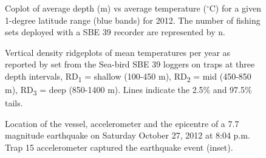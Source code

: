 \documentclass[12pt]{article}\usepackage[]{graphicx}\usepackage[]{color}
\begin{document}
\begin{figure}[htb]

{\centering {} 

}

\caption{Coplot of average depth (m) vs average temperature (\(^\circ\)C) for a given 1-degree latitude range (blue bands) for 2012. The number of fishing sets deployed with a SBE 39 recorder are represented by n.}\label{fig:figure14}
\end{figure}
\clearpage


\begin{figure}[htb]

{\centering {} 

}

\caption{Vertical density ridgeplots of mean temperatures per year as reported by set from the Sea-bird SBE 39 loggers on traps at three depth intervals, RD\textsubscript{1} = shallow (100-450 m), RD\textsubscript{2} = mid (450-850 m), RD\textsubscript{3} = deep (850-1400 m). Lines indicate the 2.5\% and 97.5\% tails.}\label{fig:figure15}
\end{figure}
\clearpage


\begin{figure}[htb]

{\centering {} 

}

\caption{Location of the vessel, accelerometer and the epicentre of a 7.7 magnitude earthquake on Saturday October 27, 2012 at 8:04 p.m. Trap 15 accelerometer captured the earthquake event (inset).}\label{fig:figure16}
\end{figure}
\clearpage
\end{document}
